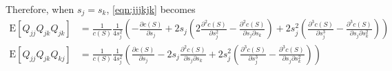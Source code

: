 \documentclass[10pt]{article}
\newcommand{\expect}[1]{\ensuremath{\mathrm{E}\left[ #1 \right]}}
\begin{document}
Therefore, when $s_j=s_k$, \eqref{eqn:jjjkjk} becomes
\begin{align}
	\expect{Q_{jj}Q_{jk}Q_{jk}} &= \frac{1}{c(S)} \frac{1}{4s_j^2} \left( -\frac{\partial c(S)}{\partial s_j} + 2s_j\left( 2\frac{\partial^2 c(S)}{\partial s_j^2} - \frac{\partial^2 c(S)}{\partial s_j \partial s_k} \right) + 2s_j^2\left( \frac{\partial^3 c(S)}{\partial s_j^3} - \frac{\partial^3 c(S)}{\partial s_j \partial s_k^2} \right) \right) \nonumber \\
	\expect{Q_{jj}Q_{jk}Q_{kj}} &= \frac{1}{c(S)} \frac{1}{4s_j^2} \left( \frac{\partial c(S)}{\partial s_j} - 2s_j\frac{\partial^2 c(S)}{\partial s_j \partial s_k} + 2s_j^2\left( \frac{\partial^3 c(S)}{\partial s_j^3} - \frac{\partial^3 c(S)}{\partial s_j \partial s_k^2} \right) \right)
\end{align}
\end{document}
